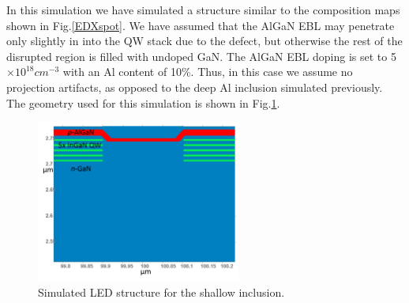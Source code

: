 In this simulation we have simulated a structure similar to the composition maps shown in Fig.\ref{EDXspot}. We have assumed that the AlGaN EBL may penetrate only slightly in into the QW stack due to the defect, but otherwise the rest of the disrupted region is filled with undoped GaN. The AlGaN EBL doping is set to 5$\times 10^{18} cm^{-3}$ with an Al content of 10$\%$. Thus, in this case we assume no projection artifacts, as opposed to the deep Al inclusion simulated previously. The geometry used for this simulation is shown in Fig.\ref{shallowgeom}.

\begin{figure}[h]
	\centering
	\includegraphics[width=0.6\textwidth]{Figs/Ch3/shallow}
	\caption[h] {Simulated LED structure for the shallow inclusion.}
	\label{shallowgeom}
\end{figure}
\FloatBarrier 

